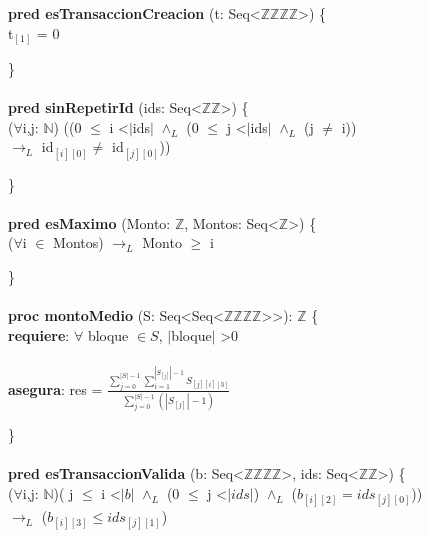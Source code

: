 \documentclass{article}
\begin{document}
    \textbf{pred esTransaccionCreacion} (t: Seq\textless$\mathds{Z}$\texttimes$\mathds{Z}$\texttimes$\mathds{Z}$\texttimes$\mathds{Z}$\textgreater) \{\\
        \indent\indent t$_{[1]}$ = 0

    \}\\\\

    \textbf{pred sinRepetirId} (ids: Seq\textless$\mathds{Z}$\texttimes$\mathds{Z}$\textgreater) \{\\
        \indent\indent($\forall$i,j: $\mathds{N}$) ((0 $\leq$ i \textless$|$ids$|$ $\land_L$ (0 $\leq$ j \textless$|$ids$|$ $\land_L$ (j $\neq$ i))\\
        \indent\indent$\rightarrow_L$ id$_{[i][0]} \neq$ id$_{[j][0]}$))

    \}\\\\

    \textbf{pred esMaximo} (Monto: $\mathds{Z}$, Montos: Seq\textless$\mathds{Z}$\textgreater) \{\\
        \indent\indent($\forall$i $\in$ Montos) $\rightarrow_L$ Monto $\geq$ i

    \}\\\\

    \textbf{proc montoMedio} 
    (S: Seq\textless Seq\textless$\mathds{Z}$\texttimes$\mathds{Z}$\texttimes$\mathds{Z}$\texttimes$\mathds{Z}$\textgreater\textgreater): $\mathds{Z}$ \{\\
        \indent\indent \textbf{requiere}: $\forall$ bloque $\in S$, $|$bloque$|$ \textgreater 0 \\\\
        \indent\indent \textbf{asegura}: res = $\frac{\sum\limits_{j=0}^{|S|-1} \sum\limits_{i=1}^{|S_{[j]}|-1} S_{[j][i][3]}}{\sum\limits_{j=0}^{|S|-1} (|S_{[j]}|-1)}$

    \}\\\\

    \textbf{pred esTransaccionValida} (b: Seq\textless $\mathds{Z}$\texttimes$\mathds{Z}$\texttimes$\mathds{Z}$\texttimes$\mathds{Z}$\textgreater, 
                                        ids: Seq\textless$\mathds{Z}$\texttimes$\mathds{Z}$\textgreater) \{\\
        \indent\indent($\forall$i,j: $\mathds{N}$)( j $\leq$ i \textless $|b|$ $\land_L$ (0 $\leq$ j \textless $|ids|$) $\land_L$ ($b_{[i][2]} = ids_{[j][0]}$))\\
        \indent\indent $\rightarrow_L$ ($b_{[i][3]} \leq ids_{[j][1]}$)
\end{document}

